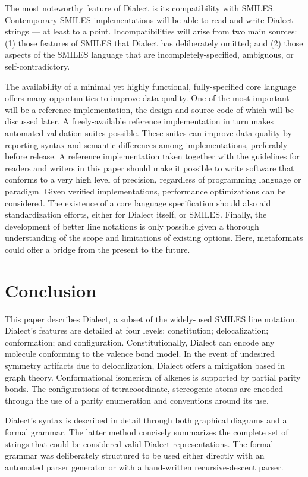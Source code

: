 \documentclass{article}
\begin{document}
The most noteworthy feature of Dialect is its compatibility with SMILES. Contemporary SMILES implementations will be able to read and write Dialect strings --- at least to a point. Incompatibilities will arise from two main sources: (1) those features of SMILES that Dialect has deliberately omitted; and (2) those aspects of the SMILES language that are incompletely-specified, ambiguous, or self-contradictory.

The availability of a minimal yet highly functional, fully-specified core language offers many opportunities to improve data quality. One of the most important will be a reference implementation, the design and source code of which will be discussed later. A freely-available reference implementation in turn makes automated validation suites possible. These suites can improve data quality by reporting syntax and semantic differences among implementations, preferably before release. A reference implementation taken together with the guidelines for readers and writers in this paper should make it possible to write software that conforms to a very high level of precision, regardless of programming language or paradigm. Given verified implementations, performance optimizations can be considered. The existence of a core language specification should also aid standardization efforts, either for Dialect itself, or SMILES. Finally, the development of better line notations is only possible given a thorough understanding of the scope and limitations of existing options. Here, metaformats could offer a bridge from the present to the future.

\section*{Conclusion}

This paper describes Dialect, a subset of the widely-\-used SMILES line notation. Dialect's features are detailed at four levels: constitution; delocalization; conformation; and configuration. Constitutionally, Dialect can encode any molecule conforming to the valence bond model. In the event of undesired symmetry artifacts due to delocalization, Dialect offers a mitigation based in graph theory. Conformational isomerism of alkenes is supported by partial parity bonds. The configurations of tetracoordinate, stereogenic atoms are encoded through the use of a parity enumeration and conventions around its use.

Dialect's syntax is described in detail through both graphical diagrams and a formal grammar. The latter method concisely summarizes the complete set of strings that could be considered valid Dialect representations. The formal grammar was deliberately structured to be used either directly with an automated parser generator or with a hand-written recursive-descent parser.
\end{document}
